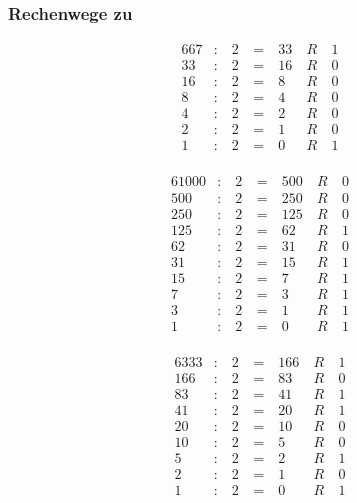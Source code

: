 \subsubsection{Rechenwege zu \protect{}}

\begin{minipage}{0.3\linewidth}
\begin{alignat*}{6}
67 & : & ~2 & ~=~ & 33 & ~R~ & 1 \\
33 & : & ~2 & ~=~ & 16 & ~R~ & 0 \\
16 & : & ~2 & ~=~ & 8 & ~R~ & 0 \\
8 & : & ~2 & ~=~ & 4 & ~R~ & 0 \\
4 & : & ~2 & ~=~ & 2 & ~R~ & 0 \\
2 & : & ~2 & ~=~ & 1 & ~R~ & 0 \\
1 & : & ~2 & ~=~ & 0 & ~R~ & 1 \\
\end{alignat*}
\end{minipage}
\begin{minipage}{0.3\linewidth}
\begin{alignat*}{6}
1000 & : & ~2 & ~=~ & 500 & ~R~ & 0 \\
500 & : & ~2 & ~=~ & 250 & ~R~ & 0 \\
250 & : & ~2 & ~=~ & 125 & ~R~ & 0 \\
125 & : & ~2 & ~=~ & 62 & ~R~ & 1 \\
62 & : & ~2 & ~=~ & 31 & ~R~ & 0 \\
31 & : & ~2 & ~=~ & 15 & ~R~ & 1 \\
15 & : & ~2 & ~=~ & 7 & ~R~ & 1 \\
7 & : & ~2 & ~=~ & 3 & ~R~ & 1 \\
3 & : & ~2 & ~=~ & 1 & ~R~ & 1 \\
1 & : & ~2 & ~=~ & 0 & ~R~ & 1 \\
\end{alignat*}
\end{minipage}
\begin{minipage}{0.3\linewidth}
\begin{alignat*}{6}
333 & : & ~2 & ~=~ & 166 & ~R~ & 1 \\
166 & : & ~2 & ~=~ & 83 & ~R~ & 0 \\
83 & : & ~2 & ~=~ & 41 & ~R~ & 1 \\
41 & : & ~2 & ~=~ & 20 & ~R~ & 1 \\
20 & : & ~2 & ~=~ & 10 & ~R~ & 0 \\
10 & : & ~2 & ~=~ & 5 & ~R~ & 0 \\
5 & : & ~2 & ~=~ & 2 & ~R~ & 1 \\
2 & : & ~2 & ~=~ & 1 & ~R~ & 0 \\
1 & : & ~2 & ~=~ & 0 & ~R~ & 1 \\
\end{alignat*}
\end{minipage}

